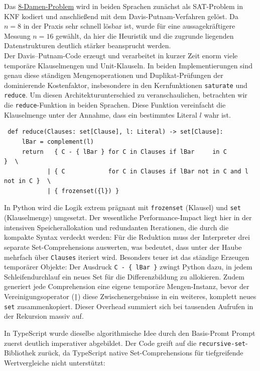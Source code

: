 Das \href{https://de.wikipedia.org/wiki/Damenproblem}{8-Damen-Problem} wird in beiden Sprachen zunächst als SAT-Problem in \ac{KNF} kodiert und anschließend mit dem Davis-Putnam-Verfahren gelöst. Da \(n=8\) in der Praxis sehr schnell lösbar ist, wurde für eine aussagekräftigere Messung \(n=16\) gewählt, da hier die Heuristik und die zugrunde liegenden Datenstrukturen deutlich stärker beansprucht werden.\\
Der Davis--Putnam-Code erzeugt und verarbeitet in kurzer Zeit enorm viele temporäre Klauselmengen und Unit-Klauseln. In beiden Implementierungen sind genau diese ständigen Mengenoperationen und Duplikat-Prüfungen der dominierende Kostenfaktor, insbesondere in den Kernfunktionen \texttt{saturate} und \texttt{reduce}. Um diesen Architekturunterschied zu veranschaulichen, betrachten wir die \texttt{reduce}-Funktion in beiden Sprachen. Diese Funktion vereinfacht die Klauselmenge unter der Annahme, dass ein bestimmtes Literal $l$ wahr ist.

\begin{verbatim}
 def reduce(Clauses: set[Clause], l: Literal) -> set[Clause]:
     lBar = complement(l)  
     return   { C - { lBar } for C in Clauses if lBar     in C                }  \
            | { C            for C in Clauses if lBar not in C and l not in C }  \
            | { frozenset({l}) }
\end{verbatim}
\label{pythonreduce}
\caption{Reduktionsschritt in Python mit Set-Comprehensions}

In Python wird die Logik extrem prägnant mit \texttt{frozenset} (Klausel) und \texttt{set} (Klauselmenge) umgesetzt. Der wesentliche Performance-Impact liegt hier in der intensiven Speicherallokation und redundanten Iterationen, die durch die kompakte Syntax verdeckt werden: Für die Reduktion muss der Interpreter drei separate Set-Comprehensions auswerten, was bedeutet, dass unter der Haube mehrfach über \texttt{Clauses} iteriert wird. Besonders teuer ist das ständige Erzeugen temporärer Objekte: Der Ausdruck \texttt{C - \{ lBar \}} zwingt Python dazu, in jedem Schleifendurchlauf ein neues Set für die Differenzbildung zu allokieren. Zudem generiert jede Comprehension eine eigene temporäre Mengen-Instanz, bevor der Vereinigungsoperator (\texttt{|}) diese Zwischenergebnisse in ein weiteres, komplett neues \texttt{set} zusammenkopiert. Dieser Overhead summiert sich bei tausenden Aufrufen in der Rekursion massiv auf.


In TypeScript wurde dieselbe algorithmische Idee durch den Basis-Promt Prompt zuerst deutlich imperativer abgebildet. Der Code greift auf die \texttt{recursive-set}-Bibliothek zurück, da TypeScript native Set-Comprehensions für tiefgreifende Wertvergleiche nicht unterstützt:

